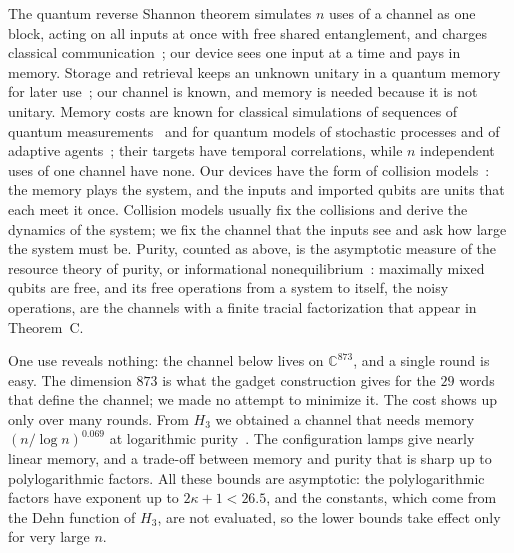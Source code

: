 The quantum reverse Shannon theorem simulates $n$ uses of a channel as one block, acting on all inputs at once with free shared entanglement,
and charges classical communication~\cite{BDHSW2014,BCR2011}; our device sees one input at a time and pays in memory. Storage and retrieval
keeps an unknown unitary in a quantum memory for later use~\cite{SBZ2019}; our channel is known, and memory is needed because it is not
unitary. Memory costs are known for classical simulations of sequences of quantum measurements~\cite{KGPLC2011,BFK2019}
and for quantum models of stochastic processes and of adaptive agents~\cite{GWRV2012,EGGT2022}; their targets have temporal correlations,
while $n$ independent uses of one channel have none. Our devices have the form of collision models~\cite{CLGP2022}: the memory plays the
system, and the inputs and imported qubits are units that each meet it once. Collision models usually fix the collisions and derive the
dynamics of the system; we fix the channel that the inputs see and ask how large the system must be. Purity, counted as above, is the asymptotic
measure of the resource theory of purity, or informational nonequilibrium~\cite{HHO2003,GMNSY2015}: maximally mixed qubits are free, and its free
operations from a system to itself, the noisy operations, are the channels with a finite tracial factorization that appear in Theorem~C.

One use reveals nothing: the channel below lives on $\mathbb C^{873}$, and a single round is easy. The dimension $873$ is what the gadget
construction gives for the $29$ words that define the channel; we made no attempt to minimize it. The cost shows up only over many rounds.
From $H_3$ we obtained a channel that needs memory $(n/\log n)^{0.069}$ at logarithmic purity~\cite{DouglasMghirbiB}. The configuration lamps
give nearly linear memory, and a trade-off between memory and purity that is sharp up to polylogarithmic factors. All these bounds are
asymptotic: the polylogarithmic factors have exponent up to $2\kappa+1<26.5$, and the constants, which come from the Dehn function of $H_3$,
are not evaluated, so the lower bounds take effect only for very large $n$.

